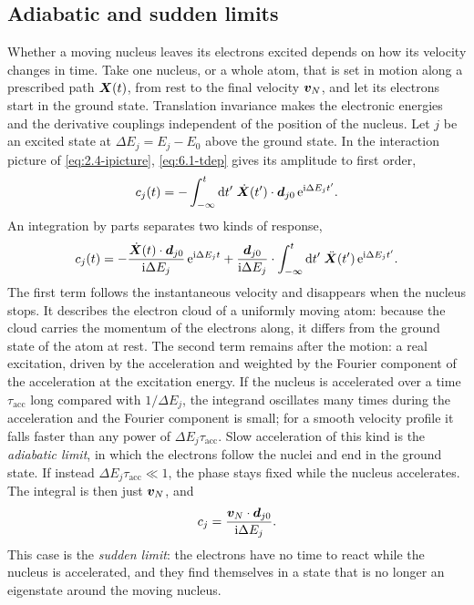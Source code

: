 \subsection{Adiabatic and sudden limits}

Whether a moving nucleus leaves its electrons excited depends on how its velocity changes in time. Take one nucleus, or a whole atom, that is set in motion along a prescribed path $\bm{X}(t)$, from rest to the final velocity $\bm{v}_N$, and let its electrons start in the ground state. Translation invariance makes the electronic energies and the derivative couplings independent of the position of the nucleus. Let $j$ be an excited state at $\Delta E_j = E_j - E_0$ above the ground state. In the interaction picture of \cref{eq:2.4-ipicture}, \cref{eq:6.1-tdep} gives its amplitude to first order,
\begin{equation*}
  c_j(t) = -\int_{-\infty}^t\mathrm{d} t'\;\dot{\bm{X}}(t')\cdot\bm{d}_{j0}\,\mathrm{e}^{\mathrm{i}\Delta E_jt'} .
\end{equation*}
An integration by parts separates two kinds of response,
\begin{equation}
  c_j(t) = -\frac{\dot{\bm{X}}(t)\cdot\bm{d}_{j0}}{\mathrm{i}\Delta E_j}\,\mathrm{e}^{\mathrm{i}\Delta E_jt}
  + \frac{\bm{d}_{j0}}{\mathrm{i}\Delta E_j}\cdot\int_{-\infty}^t\mathrm{d} t'\;\ddot{\bm{X}}(t')\,\mathrm{e}^{\mathrm{i}\Delta E_jt'} .
  \label{eq:6.1-accel}
\end{equation}
The first term follows the instantaneous velocity and disappears when the nucleus stops. It describes the electron cloud of a uniformly moving atom: because the cloud carries the momentum of the electrons along, it differs from the ground state of the atom at rest. The second term remains after the motion: a real excitation, driven by the acceleration and weighted by the Fourier component of the acceleration at the excitation energy. If the nucleus is accelerated over a time $\tau_{\mathrm{acc}}$ long compared with $1/\Delta E_j$, the integrand oscillates many times during the acceleration and the Fourier component is small; for a smooth velocity profile it falls faster than any power of $\Delta E_j\tau_{\mathrm{acc}}$. Slow acceleration of this kind is the \emph{adiabatic limit}, in which the electrons follow the nuclei and end in the ground state. If instead $\Delta E_j\tau_{\mathrm{acc}} \ll 1$, the phase stays fixed while the nucleus accelerates. The integral is then just $\bm{v}_N$, and
\begin{equation}
  c_j = \frac{\bm{v}_N\cdot\bm{d}_{j0}}{\mathrm{i}\Delta E_j} .
  \label{eq:6.1-sudden1}
\end{equation}
This case is the \emph{sudden limit}: the electrons have no time to react while the nucleus is accelerated, and they find themselves in a state that is no longer an eigenstate around the moving nucleus.

